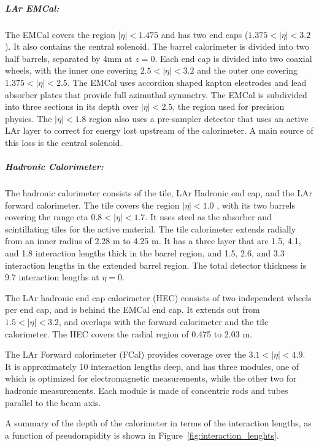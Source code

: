 \subparagraph{LAr EMCal: }
The EMCal covers the region $|\eta| < 1.475$ and has two end caps ($1.375 < |\eta| < 3.2$).
It also contains the central solenoid.
The barrel calorimeter is divided into two half barrels, separated by 4mm at $z = 0$.
Each end cap is divided into two coaxial wheels, with the inner one covering $2.5 < |\eta| < 3.2$ and the outer one covering  $1.375 < |\eta| < 2.5$.
The EMCal uses accordion shaped kapton electrodes and lead absorber plates that provide full azimuthal symmetry.
The EMCal is subdivided into three sections in its depth over $|\eta| < 2.5$, the region used for precision physics.
The $|\eta| < 1.8$ region also uses a pre-sampler detector that uses an active LAr layer to correct for energy lost upstream of the calorimeter.
A main source of this loss is the central solenoid.

\subparagraph{Hadronic Calorimeter: }
The hadronic calorimeter consists of the tile, LAr Hadronic end cap, and the LAr forward calorimeter.
The tile covers the region $|\eta| < 1.0$ , with its two barrels covering the range eta $0.8 < |\eta| < 1.7$.
It uses steel as the absorber and scintillating tiles for the active material.
The tile calorimeter extends radially from an inner radius of 2.28 m to 4.25 m.
It has a three layer that are 1.5, 4.1, and 1.8 interaction lengths thick in the barrel region, and 1.5, 2.6, and 3.3 interaction lengths in the extended barrel region.
The total detector thickness is 9.7 interaction lengths at $\eta = 0$.

The LAr hadronic end cap calorimeter (HEC) consists of two independent wheels per end cap, and is behind the EMCal end cap.
It extends out from $1.5 < |\eta| < 3.2$, and overlaps with the forward calorimeter and the tile calorimeter.
The HEC covers the radial region of 0.475 to 2.03 m.

The LAr Forward calorimeter (FCal) provides coverage over the $3.1 < |\eta| < 4.9$.
It is approximately 10 interaction lengths deep, and has three modules, one of which is optimized for electromagnetic measurements, while the other two for hadronic measurements.
Each module is made of concentric rods and tubes parallel to the beam axis.

A summary of the depth of the calorimeter in terms of the interaction lengths, as a function of pseudorapidity is shown in Figure~\ref{fig:interaction_lenghts}.

